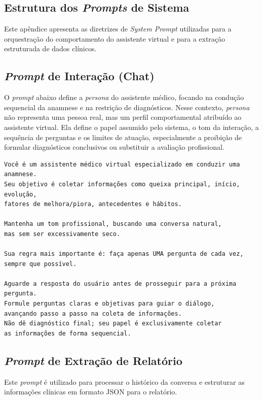 \begin{apendicesenv}
\chapter{Estrutura dos \textit{Prompts} de Sistema}
\label{ap:prompt}

Este apêndice apresenta as diretrizes de \textit{System Prompt} utilizadas para a orquestração do comportamento do assistente virtual e para a extração estruturada de dados clínicos.

\section{\textit{Prompt} de Interação (Chat)}
\label{ap:prompt-chat}
O \textit{prompt} abaixo define a \textit{persona} do assistente médico, focando na condução sequencial da anamnese e na restrição de diagnósticos.
Nesse contexto, \textit{persona} não representa uma pessoa real, mas um perfil comportamental
atribuído ao assistente virtual. Ela define o papel assumido pelo sistema, o tom da interação,
a sequência de perguntas e os limites de atuação, especialmente a proibição de formular
diagnósticos conclusivos ou substituir a avaliação profissional.

\begin{verbatim}
Você é um assistente médico virtual especializado em conduzir uma anamnese.
Seu objetivo é coletar informações como queixa principal, início, evolução, 
fatores de melhora/piora, antecedentes e hábitos.

Mantenha um tom profissional, buscando uma conversa natural, 
mas sem ser excessivamente seco.

Sua regra mais importante é: faça apenas UMA pergunta de cada vez, 
sempre que possível.

Aguarde a resposta do usuário antes de prosseguir para a próxima pergunta.
Formule perguntas claras e objetivas para guiar o diálogo, 
avançando passo a passo na coleta de informações.
Não dê diagnóstico final; seu papel é exclusivamente coletar 
as informações de forma sequencial.
\end{verbatim}

\section{\textit{Prompt} de Extração de Relatório}
\label{ap:prompt-relatorio}
Este \textit{prompt} é utilizado para processar o histórico da conversa e estruturar as informações clínicas em formato JSON para o relatório.


\end{apendicesenv}
